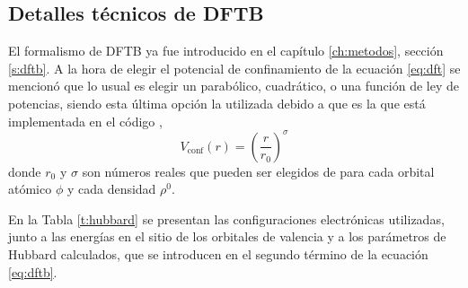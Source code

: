 \subsection{Detalles técnicos de DFTB}\label{ss:dftb}

El formalismo de DFTB ya fue introducido en el capítulo \ref{ch:metodos}, 
sección \ref{s:dftb}. A la hora de elegir el potencial de confinamiento de la
ecuación \ref{eq:dft} se mencionó que lo usual es elegir un parabólico, 
cuadrático, o una función de ley de potencias, siendo esta última opción la 
utilizada debido a que es la que está implementada en el código 
\cite{hotcent},
\begin{equation}\label{eq:vconf}
    V_{\text{conf}}(r)=\left(\frac{r}{r_0}\right)^{\sigma}
\end{equation}
donde $r_0$ y $\sigma$ son números reales que pueden ser elegidos de para cada 
orbital atómico $\phi$ y cada densidad $\rho^0$.

En la Tabla \ref{t:hubbard} se presentan las configuraciones electrónicas 
utilizadas, junto a las energías en el sitio de los orbitales de valencia y a 
los parámetros de Hubbard calculados, que se introducen en el segundo término
de la ecuación \ref{eq:dftb}.
\begin{table}[h!]
    \centering
    \caption{Configuraciones electrónicas, energías en el sitio de los orbitales
    de valencia y parámetros de Hubbard calculados con el funcional de intercambio
    y correlación PBE.}
    \setlength\extrarowheight{2pt}
    \label{t:hubbard}
\end{table}

